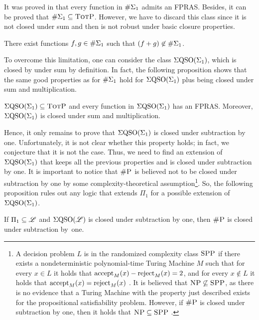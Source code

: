 It was proved in \cite{SalujaST95} that every function in $\#\Sigma_{1}$ admits an FPRAS. Besides, it can be proved that $\#\Sigma_{1} \subseteq \text{\sc TotP}$. 
However, we have to discard this class since it is not closed under sum and then is not robust under basic closure properties. 
\begin{proposition}\label{prop-e1-nc}
There exist functions $f, g \in \#\Sigma_{1}$ such that $(f + g) \not\in \#\Sigma_{1}$.
\end{proposition}
To overcome this limitation, one can consider the class $\Sigma{\rm QSO}(\Sigma_{1})$, which is closed by under sum by definition. In fact, the following proposition shows that the same good properties as for $\#\Sigma_{1}$ hold for $\Sigma{\rm QSO}(\Sigma_{1})$ plus being closed under sum and multiplication.
\begin{proposition} \label{prop:qe0-fp-qe1-totp-fptras}
$\Sigma{\rm QSO}(\Sigma_{1}) \subseteq \text{\sc TotP}$ and every function in $\Sigma{\rm QSO}(\Sigma_{1})$ has an FPRAS. Moreover, $\Sigma{\rm QSO}(\Sigma_{1})$ is closed under sum and multiplication.
\end{proposition}
Hence, it only remains to prove that $\Sigma{\rm QSO}(\Sigma_{1})$ is closed under subtraction by one. Unfortunately, it is not clear whether this property holds; in fact, we conjecture that it is not the case. Thus, we need to find an extension of $\Sigma{\rm QSO}(\Sigma_{1})$ that keeps all the previous properties and is closed under subtraction by one. It is important to notice that $\text{\sc \#P}$ is believed not to be closed under subtraction by one by some complexity-theoretical assumption\footnote{A decision problem $L$ is in the randomized complexity class $\text{\sc SPP}$ if there exists a nondeterministic polynomial-time Turing Machine $M$ such that for every $x \in L$ it holds that $\text{\rm accept}_M(x) - \text{\rm reject}_M(x) = 2$, and for every $x \not\in L$ it holds that $\text{\rm accept}_M(x) = \text{\rm reject}_M(x)$ \cite{OH93,FFK94}. It is believed that $\text{\sc NP} \not\subseteq \text{\sc SPP}$, as there is no evidence that a Turing Machine with the property just described exists for the propositional satisfiability problem. However, if $\text{\sc \#P}$ is closed under subtraction by one, then it holds that $\text{\sc NP} \subseteq \text{\sc SPP}$ \cite{OH93}.}. So, the following proposition rules out any logic that extends $\Pi_1$ for a possible extension of~$\Sigma{\rm QSO}(\Sigma_{1})$.
\begin{proposition}
If $\Pi_1 \subseteq \mathscr{L}$ and $\Sigma{\rm QSO}(\mathscr{L})$ is closed under subtraction by one, then $\text{\sc \#P}$ is closed under subtraction by~one. 
\end{proposition}
